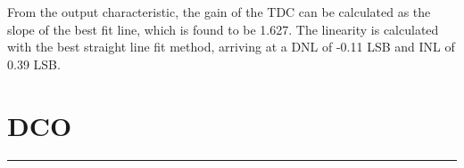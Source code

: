 From the output characteristic, the gain of the TDC can be calculated as the slope of the best fit line, which is found to be 1.627. The linearity is calculated with the best straight line fit method,
arriving at a DNL of -0.11 LSB and INL of 0.39 LSB.

\section{DCO}

\noindent\rule{\textwidth}{1pt}